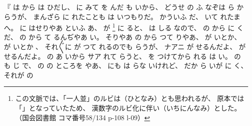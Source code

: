 
%
『
は
から
は
ひだし、
%
に
みて
を
んだ
も
いから、
%
どうせ
の
ふ
なぞは
ら
からうが、
%
まんざら
に
れたことも
は
いつもりだ。
%
かういふ
だ、
%
いて
れたまへ。
%
に
はせりやあ
といふ
あ、
%
が
\footnote{%
この文脈では、「一人並」のルビは（ひとなみ）とも思われるが、
原本では「」となっていたため、
漢数字のルビ化に伴い（いちにんなみ）とした。
（国会図書館 コマ番号58/134 p-108 l-09）
}%
に
%
ると、
%
は
しる
なので、
%
の
から
に
%
く
だ、
%
の
から
て
るんぢやあ
い。
%
そりやあ
の
から
つて
りやあ、
%
が%
いとか、
%
が
いとか
、
%
%
それ〴〵に
が
つて
れるのでも
らうが、
%
ナアニ
が
%
せるんだよ、
%
が
せるんだよ。
%
の
あ
いから
サア
れて
らうと、
%
を
つけてから
れる
は
い。
%
の
も
%
じ
で、
%
の
の
ところを
やあ、
%
にも
は
らな
%
いけれど、
%
だか
ら
いが
に
く、
%
それが
の
